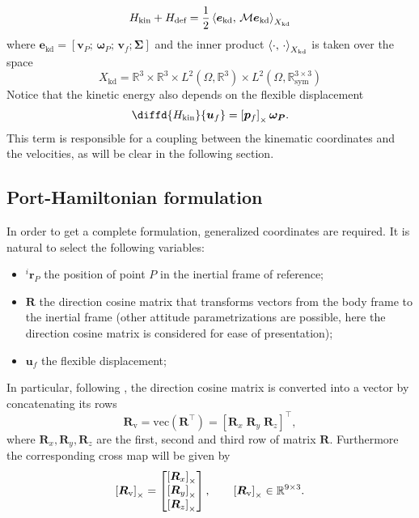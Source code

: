 \begin{equation}
H_{\text{kin}} + H_{\text{def}} = \frac{1}{2} \inner[X_{\text{kd}}]{\bm{e}_{\text{kd}}}{{\mathcal{M}} \bm{e}_{\text{kd}}}
\end{equation}
where $\bm{e}_{\text{kd}} = [\bm{v}_P; \, \bm{\omega}_P; \, \bm{v}_f; \bm{\Sigma}]$ and the inner product $\inner[X_{\text{kd}}]{\cdot}{\cdot}$ is taken over the space 
$$ 	X_{\text{kd}} = \mathbb{R}^3 \times \mathbb{R}^3 \times {L}^2(\Omega, \mathbb{R}^3) \times {L}^2(\Omega, \mathbb{R}^{3\times 3}_{\text{sym}})$$ 
Notice that the kinetic energy also depends on the flexible displacement
\[
\diffd{H_{\text{kin}}}{\bm{u}_f} = \crmat{\bm{p}_f} \bm{\omega_{P}}.
\]
This term is responsible for a coupling between the kinematic coordinates and the velocities, as will be clear in the following section. 

\subsection{Port-Hamiltonian formulation}
In order to get a complete formulation, generalized coordinates are required. It is natural to select the following variables:
\begin{itemize}
	\item $^i \bm{r}_P$ the position of point $P$ in the inertial frame of reference;
	\item $\bm{R}$ the direction cosine matrix that transforms vectors from the body frame to the inertial frame (other attitude parametrizations are possible, here the direction cosine matrix is considered for ease of presentation);
	\item $\bm{u}_f$ the flexible displacement;
\end{itemize}

In particular, following \cite{forni2015}, the direction cosine matrix is converted into a vector by concatenating its rows
\begin{equation*}
\bm{R}_{\text{v}} = \text{vec}(\bm{R}^\top) = [\bm{R}_x \; \bm{R}_y \; \bm{R}_z]^\top,
\end{equation*}
where $\bm{R}_{x}, \bm{R}_{y}, \bm{R}_{z}$ are the first, second and third row of matrix $\bm{R}$. Furthermore the corresponding cross map will be given by
\begin{equation*}
\crmat{\bm{R}_{\text{v}}} = 
\begin{bmatrix}
\crmat{\bm{R}_x} \\
\crmat{\bm{R}_y} \\
\crmat{\bm{R}_z} \\
\end{bmatrix}, \qquad 
\crmat{\bm{R}_{\text{v}}} \in \mathbb{R}^{9 \times 3}.
\end{equation*}

